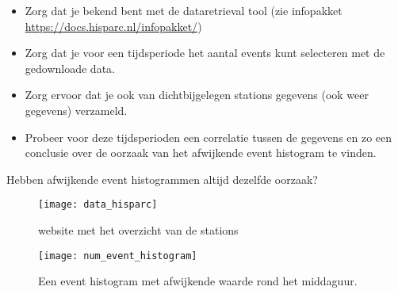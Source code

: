 \begin{questions}
\begin{EnvUplevel}
\begin{itemize}
    \item Zorg dat je bekend bent met de dataretrieval tool
    (zie infopakket \url{https://docs.hisparc.nl/infopakket/})
    \item Zorg dat je voor een tijdsperiode het aantal events kunt selecteren met de gedownloade data.
    \item Zorg ervoor dat je ook van dichtbijgelegen stations gegevens (ook
    weer gegevens) verzameld.
    \item Probeer voor deze tijdsperioden een
    correlatie tussen de gegevens en zo een conclusie over de oorzaak van
    het afwijkende event histogram te vinden.
\end{itemize}
\end{EnvUplevel}



\question Hebben afwijkende event histogrammen altijd dezelfde oorzaak?

\begin{figure}
    \centering
    \texttt{[image: data\_hisparc]}
    \caption{website met het overzicht van de stations}
    \label{fig:data_hisparc}
\end{figure}

\begin{figure}
    \centering
    \texttt{[image: num\_event\_histogram]}
    \caption{Een event histogram met afwijkende waarde rond het middaguur.}
    \label{fig:Event_histogram}
\end{figure}

\end{questions}


